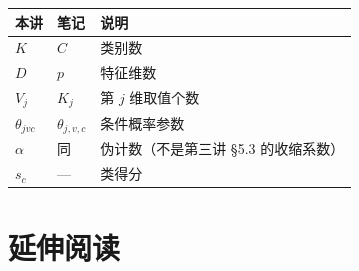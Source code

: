 \documentclass[11pt,a4paper,fontset=windows,zihao=-4]{ctexart}
\newcommand{\tabhead}{\sffamily\bfseries\color{navy}}
\begin{document}
\begin{center}
\small
\begin{tabular}{@{}lll@{}}
\toprule
\rowcolor{navy!7}
\tabhead 本讲 & \tabhead 笔记 & \tabhead 说明\\
\midrule
$K$ & $C$ & 类别数\\
$D$ & $p$ & 特征维数\\
$V_j$ & $K_j$ & 第 $j$ 维取值个数\\
$\theta_{jvc}$ & $\theta_{j,v,c}$ & 条件概率参数\\
$\alpha$ & 同 & 伪计数（不是第三讲 §5.3 的收缩系数）\\
$s_c$ & --- & 类得分\\
\bottomrule
\end{tabular}
\end{center}

\section{延伸阅读}
\end{document}
